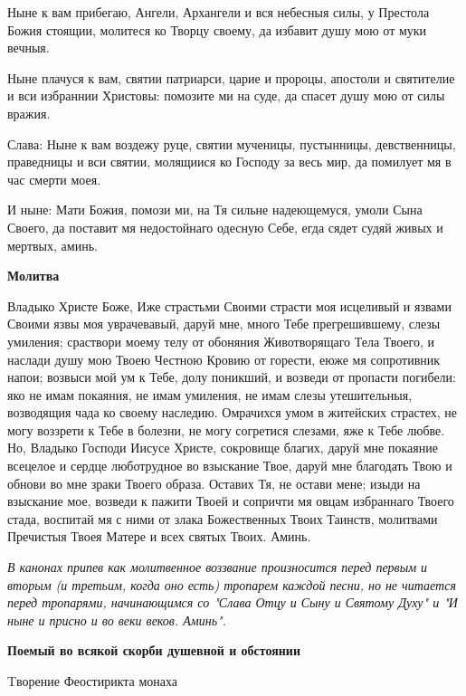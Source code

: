 Ныне к вам прибегаю, Ангели, Архангели и вся небесныя силы, у Престола Божия стоящии, молитеся ко Творцу своему, да избавит душу мою от муки вечныя.


Ныне плачуся к вам, святии патриарси, царие и пророцы, апостоли и святителие и вси избраннии Христовы: помозите ми на суде, да спасет душу мою от силы вражия.


Слава: Ныне к вам воздежу руце, святии мученицы, пустынницы, девственницы, праведницы и вси святии, молящиися ко Господу за весь мир, да помилует мя в час смерти моея.


И ныне: Мати Божия, помози ми, на Тя сильне надеющемуся, умоли Сына Своего, да поставит мя недостойнаго одесную Себе, егда сядет судяй живых и мертвых, аминь.


\medskip
\bfseries Молитва\normalfont{}


Владыко Христе Боже, Иже страстьми Своими страсти моя исцеливый и язвами Своими язвы моя уврачевавый, даруй мне, много Тебе прегрешившему, слезы умиления; сраствори моему телу от обоняния Животворящаго Тела Твоего, и наслади душу мою Твоею Честною Кровию от горести, еюже мя сопротивник напои; возвыси мой ум к Тебе, долу поникший, и возведи от пропасти погибели: яко не имам покаяния, не имам умиления, не имам слезы утешительныя, возводящия чада ко своему наследию. Омрачихся умом в житейских страстех, не могу воззрети к Тебе в болезни, не могу согретися слезами, яже к Тебе любве. Но, Владыко Господи Иисусе Христе, сокровище благих, даруй мне покаяние всецелое и сердце люботрудное во взыскание Твое, даруй мне благодать Твою и обнови во мне зраки Твоего образа. Оставих Тя, не остави мене; изыди на взыскание мое, возведи к пажити Твоей и сопричти мя овцам избраннаго Твоего стада, воспитай мя с ними от злака Божественных Твоих Таинств, молитвами Пречистыя Твоея Матере и всех святых Твоих. Аминь.



\itshape В канонах припев как молитвенное воззвание произносится перед первым и вторым (и третьим, когда оно есть) тропарем каждой песни, но не читается перед тропарями, начинающимся со "Слава Отцу и Сыну и Святому Духу" и "И ныне и присно и во веки веков. Аминь". \normalfont{}

\mychapterending

 
\bfseries Поемый во всякой скорби душевной и обстоянии


 Tворение Феостирикта монаха\normalfont{}



